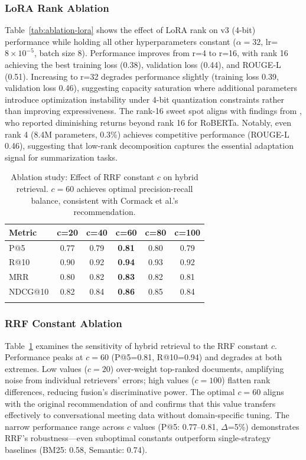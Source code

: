 \documentclass[pdflatex,sn-basic]{sn-jnl}
\begin{document}
\subsubsection{LoRA Rank Ablation}
Table~\ref{tab:ablation-lora} shows the effect of LoRA rank on v3 (4-bit) performance while holding all other hyperparameters constant ($\alpha=32$, lr=$8 \times 10^{-5}$, batch size 8). Performance improves from r=4 to r=16, with rank 16 achieving the best training loss (0.38), validation loss (0.44), and ROUGE-L (0.51). Increasing to r=32 degrades performance slightly (training loss 0.39, validation loss 0.46), suggesting capacity saturation where additional parameters introduce optimization instability under 4-bit quantization constraints rather than improving expressiveness. The rank-16 sweet spot aligns with findings from \cite{hu2022lora}, who reported diminishing returns beyond rank 16 for RoBERTa. Notably, even rank 4 (8.4M parameters, 0.3\%) achieves competitive performance (ROUGE-L 0.46), suggesting that low-rank decomposition captures the essential adaptation signal for summarization tasks.

\begin{table}[tb]
    \caption{Ablation study: Effect of RRF constant $c$ on hybrid retrieval. $c=60$ achieves optimal precision-recall balance, consistent with Cormack et al.'s recommendation.}
    \label{tab:ablation-rrf}
    \centering
    \small
    \begin{tabular}{lccccc}
        \toprule
        \textbf{Metric} & \textbf{c=20} & \textbf{c=40} & \textbf{c=60} & \textbf{c=80} & \textbf{c=100} \\
        \midrule
        P@5 & 0.77 & 0.79 & \textbf{0.81} & 0.80 & 0.79 \\
        R@10 & 0.90 & 0.92 & \textbf{0.94} & 0.93 & 0.92 \\
        MRR & 0.80 & 0.82 & \textbf{0.83} & 0.82 & 0.81 \\
        NDCG@10 & 0.82 & 0.84 & \textbf{0.86} & 0.85 & 0.84 \\
        \botrule
    \end{tabular}
\end{table}

\subsubsection{RRF Constant Ablation}
Table~\ref{tab:ablation-rrf} examines the sensitivity of hybrid retrieval to the RRF constant $c$. Performance peaks at $c=60$ (P@5=0.81, R@10=0.94) and degrades at both extremes. Low values ($c=20$) over-weight top-ranked documents, amplifying noise from individual retrievers' errors; high values ($c=100$) flatten rank differences, reducing fusion's discriminative power. The optimal $c=60$ aligns with the original recommendation of \cite{cormack2009rrf} and confirms that this value transfers effectively to conversational meeting data without domain-specific tuning. The narrow performance range across $c$ values (P@5: 0.77--0.81, $\Delta$=5\%) demonstrates RRF's robustness—even suboptimal constants outperform single-strategy baselines (BM25: 0.58, Semantic: 0.74).
\end{document}
